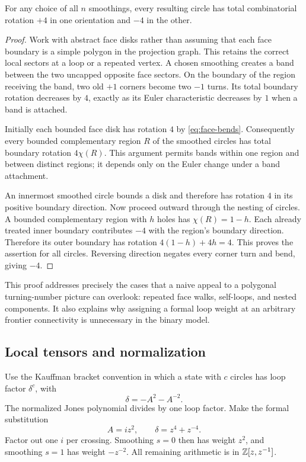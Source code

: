 \begin{lemma}
For any choice of all $n$ smoothings, every resulting circle has total
combinatorial rotation $+4$ in one orientation and $-4$ in the other.
\label{lem:rotation}
\end{lemma}
\begin{proof}
Work with abstract face disks rather than assuming that each face boundary
is a simple polygon in the projection graph. This retains the correct local
sectors at a loop or a repeated vertex. A chosen smoothing creates a band
between the two uncapped opposite face sectors. On the boundary of the
region receiving the band, two old $+1$ corners become two $-1$ turns. Its
total boundary rotation decreases by $4$, exactly as its Euler characteristic
decreases by $1$ when a band is attached.

Initially each bounded face disk has rotation $4$ by
\eqref{eq:face-bends}. Consequently every bounded complementary region $R$
of the smoothed circles has total boundary rotation $4\chi(R)$. This
argument permits bands within one region and between distinct regions; it
depends only on the Euler change under a band attachment.

An innermost smoothed circle bounds a disk and therefore has rotation $4$
in its positive boundary direction. Now proceed outward through the nesting
of circles. A bounded complementary region with $h$ holes has
$\chi(R)=1-h$. Each already treated inner boundary contributes $-4$ with
the region's boundary direction. Therefore its outer boundary has rotation
$4(1-h)+4h=4$. This proves the assertion for all circles. Reversing direction
negates every corner turn and bend, giving $-4$.
\end{proof}

This proof addresses precisely the cases that a naive appeal to a polygonal
turning-number picture can overlook: repeated face walks, self-loops, and
nested components. It also explains why assigning a formal loop weight at
an arbitrary frontier connectivity is unnecessary in the binary model.

\subsection{Local tensors and normalization}

Use the Kauffman bracket convention in which a state with $c$ circles has
loop factor $\delta^c$, with
\[
 \delta=-A^2-A^{-2}.
\]
The normalized Jones polynomial divides by one loop factor. Make the formal
substitution
\[
 A=i z^2,\qquad \delta=z^4+z^{-4}.
\]
Factor out one $i$ per crossing. Smoothing $s=0$ then has weight $z^2$,
and smoothing $s=1$ has weight $-z^{-2}$. All remaining arithmetic is in
$\mathbb Z[z,z^{-1}]$.

